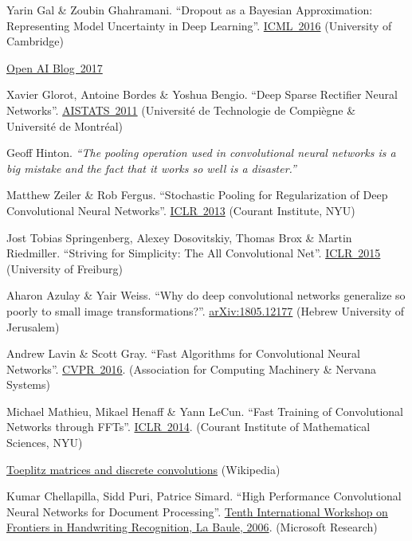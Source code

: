 \documentclass{article}
\begin{document}
\begin{thebibliography}{10}
 Yarin Gal \& Zoubin Ghahramani. ``Dropout as a Bayesian Approximation: Representing Model Uncertainty in Deep Learning''. \href{http://proceedings.mlr.press/v48/gal16.pdf}{ICML~2016} (University of Cambridge)

 \href{https://blog.openai.com/nonlinear-computation-in-linear-networks/}{Open AI Blog~2017} 

 Xavier Glorot, Antoine Bordes \& Yoshua Bengio. ``Deep Sparse Rectifier Neural Networks''. \href{http://proceedings.mlr.press/v15/glorot11a/glorot11a.pdf}{AISTATS~2011} (Universit\'e de Technologie de Compi\`egne \& Universit\'e de Montr\'eal)

 Geoff Hinton. {\it ``The pooling operation used in convolutional neural networks is a big mistake and the fact that it works so well is a disaster.''}

 Matthew Zeiler \& Rob Fergus. ``Stochastic Pooling for Regularization of Deep Convolutional Neural Networks''. \href{https://arxiv.org/abs/1301.3557}{ICLR~2013} (Courant Institute, NYU)

 Jost Tobias Springenberg, Alexey Dosovitskiy, Thomas Brox \& Martin Riedmiller. ``Striving for Simplicity: The All Convolutional Net''. \href{https://arxiv.org/abs/1412.6806}{ICLR~2015} (University of Freiburg)

 Aharon Azulay \& Yair Weiss. ``Why do deep convolutional networks generalize so poorly to small image transformations?''. \href{https://arxiv.org/pdf/1805.12177.pdf}{	arXiv:1805.12177} (Hebrew University of Jerusalem)

 Andrew Lavin \& Scott Gray. ``Fast Algorithms for Convolutional Neural Networks''. \href{https://pdfs.semanticscholar.org/8758/5d3dc3a771704855186d5625542acec2f01b.pdf}{CVPR~2016}. (Association for Computing Machinery \& Nervana Systems)

 Michael Mathieu, Mikael Henaff \& Yann LeCun. ``Fast Training of Convolutional Networks through FFTs''. \href{https://arxiv.org/abs/1312.5851}{ICLR~2014}. (Courant Institute of Mathematical Sciences, NYU)

 \href{https://en.wikipedia.org/wiki/Toeplitz_matrix#Discrete_convolution}{Toeplitz matrices and discrete convolutions} (Wikipedia)

 Kumar Chellapilla, Sidd Puri, Patrice Simard. ``High Performance Convolutional Neural Networks for Document Processing''. \href{https://hal.inria.fr/inria-00112631/document}{Tenth International Workshop on Frontiers in Handwriting Recognition, La Baule, 2006}. (Microsoft Research)


\end{thebibliography}
\end{document}
